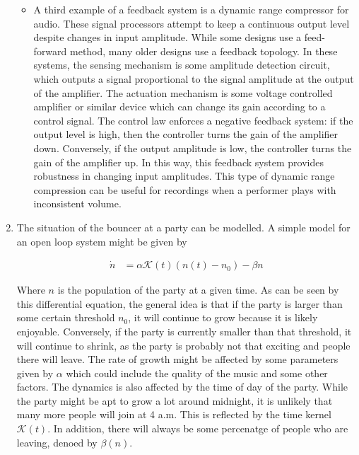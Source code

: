 \documentclass[11pt]{article}
\theoremstyle{definition}
\begin{document}
\begin{enumerate}
\begin{itemize}
        \item A third example of a feedback system is a dynamic range compressor for audio.  These signal processors attempt to keep a continuous output level despite changes in input amplitude.  While some designs use a feed-forward method, many older designs use a feedback topology.  In these systems, the sensing mechanism is some amplitude detection circuit, which outputs a signal proportional to the signal amplitude at the output of the amplifier.  The actuation mechanism is some voltage controlled amplifier or similar device which can change its gain according to a control signal.  The control law enforces a negative feedback system: if the output level is high, then the controller turns the gain of the amplifier down.  Conversely, if the output amplitude is low, the controller turns the gain of the amplifier up.  In this way, this feedback system provides robustness in changing input amplitudes.  This type of dynamic range compression can be useful for recordings when a performer plays with inconsistent volume.
    \end{itemize}
    
    \item %

    The situation of the bouncer at a party can be modelled.  A simple model for an open loop system might be given by

    \begin{align*}
        \dot{n} &= \alpha \mathcal{K}(t) (n(t) - n_0) - \beta{n}
    \end{align*}

    Where $n$ is the population of the party at a given time.  As can be seen by this differential equation, the general idea is that if the party is larger than some certain threshold $n_0$, it will continue to grow because it is likely enjoyable.  Conversely, if the party is currently smaller than that threshold, it will continue to shrink, as the party is probably not that exciting and people there will leave.  The rate of growth might be affected by some parameters given by $\alpha$ which could include the quality of the music and some other factors.  The dynamics is also affected by the time of day of the party.  While the party might be apt to grow a lot around midnight, it is unlikely that many more people will join at 4 a.m.  This is reflected by the time kernel $\mathcal{K}(t)$.  In addition, there will always be some percenatge of people who are leaving, denoed by $\beta(n)$.


\end{enumerate}
\end{document}
